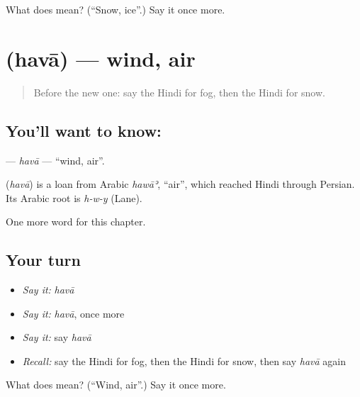 \begin{tcolorbox}[breakable,colback=teal!4,colframe=teal!35!black,title={Before you move on}]
What does  mean? (\textquotedblleft{}Snow, ice\textquotedblright{}.) Say it once more.
\end{tcolorbox}
\section[\texorpdfstring{\hi{हवा} (havā)}{हवा (havā)}]{ (havā) — wind, air}

\label{lesson:HI-C145-hava}



\begin{quote}
Before the new one: say the Hindi for fog, then the Hindi for snow.
\end{quote}

\subsection*{You'll want to know: }
\textbf{} — \emph{havā} — \textquotedblleft{}wind, air\textquotedblright{}.

\begin{cousinweb}
\textbf{} (\emph{havā}) is a loan from Arabic \emph{hawāʾ}, \textquotedblleft{}air\textquotedblright{}, which reached Hindi through Persian. Its Arabic root is \emph{h-w-y} (Lane).
\end{cousinweb}

\begin{grammarlens}[title={What you've built}]
One more word for this chapter.
\end{grammarlens}

\subsection*{Your turn}
\begin{itemize}
\raggedright
  \item \emph{Say it:} \emph{havā}
  \item \emph{Say it:} \emph{havā}, once more
  \item \emph{Say it:} say \emph{havā}
  \item \emph{Recall:} say the Hindi for fog, then the Hindi for snow, then say \emph{havā} again
\end{itemize}

\begin{tcolorbox}[breakable,colback=teal!4,colframe=teal!35!black,title={Before you move on}]
What does  mean? (\textquotedblleft{}Wind, air\textquotedblright{}.) Say it once more.
\end{tcolorbox}
